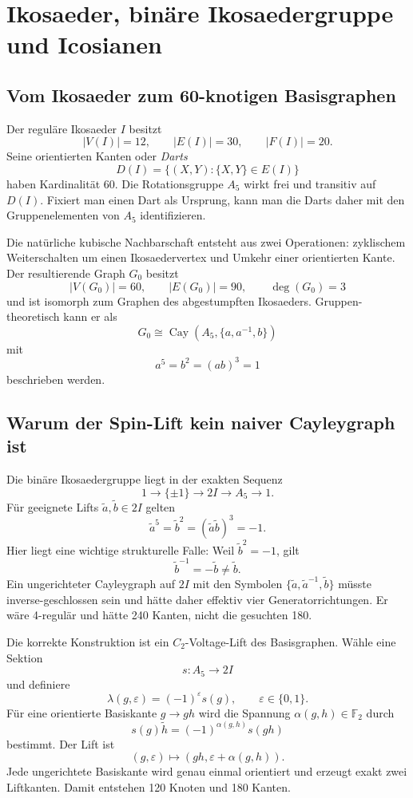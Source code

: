 \documentclass[11pt,a4paper]{article}
\theoremstyle{definition}
\newcommand{\twoI}{2I}
\begin{document}
\section{Ikosaeder, binäre Ikosaedergruppe und Icosianen}

\subsection{Vom Ikosaeder zum 60-knotigen Basisgraphen}

Der reguläre Ikosaeder \(I\) besitzt
\[
|V(I)|=12,\qquad |E(I)|=30,\qquad |F(I)|=20.
\]
Seine orientierten Kanten oder \emph{Darts}
\[
D(I)=\{(X,Y):\{X,Y\}\in E(I)\}
\]
haben Kardinalität \(60\). Die Rotationsgruppe \(A_5\) wirkt frei und transitiv auf \(D(I)\). Fixiert man einen Dart als Ursprung, kann man die Darts daher mit den Gruppenelementen von \(A_5\) identifizieren.

Die natürliche kubische Nachbarschaft entsteht aus zwei Operationen: zyklischem Weiterschalten um einen Ikosaedervertex und Umkehr einer orientierten Kante. Der resultierende Graph \(G_0\) besitzt
\[
|V(G_0)|=60,\qquad |E(G_0)|=90,\qquad \deg(G_0)=3
\]
und ist isomorph zum Graphen des abgestumpften Ikosaeders. Gruppen-theoretisch kann er als
\[
G_0\cong \operatorname{Cay}\!\left(A_5,\{a,a^{-1},b\}\right)
\]
mit
\[
a^5=b^2=(ab)^3=1
\]
beschrieben werden.

\subsection{Warum der Spin-Lift kein naiver Cayleygraph ist}

Die binäre Ikosaedergruppe liegt in der exakten Sequenz
\[
1\longrightarrow\{\pm1\}\longrightarrow\twoI
\longrightarrow A_5\longrightarrow1.
\]
Für geeignete Lifts \(\tilde a,\tilde b\in\twoI\) gelten
\[
\tilde a^5=\tilde b^2=(\tilde a\tilde b)^3=-1.
\]
Hier liegt eine wichtige strukturelle Falle: Weil \(\tilde b^2=-1\), gilt
\[
\tilde b^{-1}=-\tilde b\neq\tilde b.
\]
Ein ungerichteter Cayleygraph auf \(\twoI\) mit den Symbolen
\(\{\tilde a,\tilde a^{-1},\tilde b\}\) müsste inverse-geschlossen sein und hätte daher effektiv vier Generatorrichtungen. Er wäre 4-regulär und hätte 240 Kanten, nicht die gesuchten 180.

Die korrekte Konstruktion ist ein \(C_2\)-Voltage-Lift des Basisgraphen. Wähle eine Sektion
\[
s:A_5\to\twoI
\]
und definiere
\[
\lambda(g,\varepsilon)=(-1)^\varepsilon s(g),\qquad
\varepsilon\in\{0,1\}.
\]
Für eine orientierte Basiskante \(g\to gh\) wird die Spannung
\(\alpha(g,h)\in\mathbb F_2\) durch
\[
s(g)\tilde h=(-1)^{\alpha(g,h)}s(gh)
\]
bestimmt. Der Lift ist
\[
(g,\varepsilon)\longmapsto
(gh,\varepsilon+\alpha(g,h)).
\]
Jede ungerichtete Basiskante wird genau einmal orientiert und erzeugt exakt zwei Liftkanten. Damit entstehen 120 Knoten und 180 Kanten.
\end{document}
